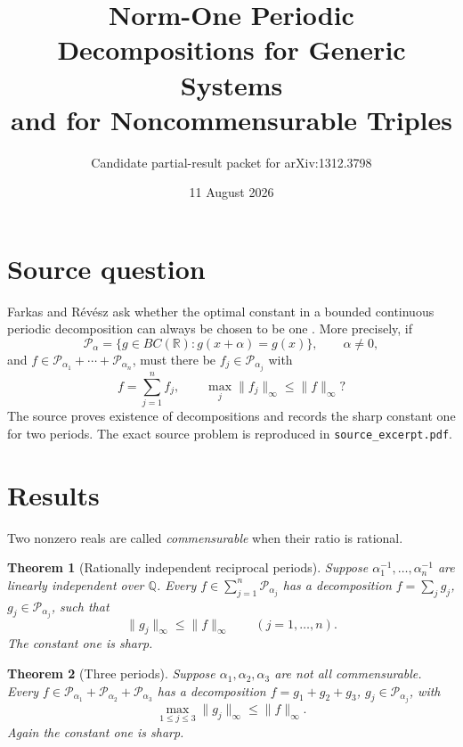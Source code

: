\documentclass[11pt]{article}
\title{Norm-One Periodic Decompositions for Generic Systems\\
and for Noncommensurable Triples}
\author{Candidate partial-result packet for arXiv:1312.3798}
\date{11 August 2026}
\newtheorem{theorem}{Theorem}
\newcommand{\R}{\mathbb R}
\newcommand{\Q}{\mathbb Q}
\newcommand{\Pcal}{\mathcal P}
\begin{document}
\maketitle

\begin{center}
\end{center}

\section{Source question}

Farkas and R\'ev\'esz ask whether the optimal constant in a bounded continuous
periodic decomposition can always be chosen to be one
\cite[problem following Remark 3.5]{FR}.  More precisely, if
\[
 \Pcal_\alpha=\{g\in BC(\R):g(x+\alpha)=g(x)\},\qquad \alpha\ne0,
\]
and $f\in\Pcal_{\alpha_1}+\cdots+\Pcal_{\alpha_n}$, must there be
$f_j\in\Pcal_{\alpha_j}$ with
\[
 f=\sum_{j=1}^n f_j,
 \qquad \max_j\|f_j\|_\infty\le\|f\|_\infty?
\]
The source proves existence of decompositions and records the sharp constant
one for two periods.  The exact source problem is reproduced in
\texttt{source\_excerpt.pdf}.

\section{Results}

Two nonzero reals are called \emph{commensurable} when their ratio is
rational.

\begin{theorem}[Rationally independent reciprocal periods]\label{th:generic}
Suppose $\alpha_1^{-1},\ldots,\alpha_n^{-1}$ are linearly independent over
$\Q$.  Every $f\in\sum_{j=1}^n\Pcal_{\alpha_j}$ has a decomposition
$f=\sum_j g_j$, $g_j\in\Pcal_{\alpha_j}$, such that
\[
 \|g_j\|_\infty\le\|f\|_\infty\qquad(j=1,\ldots,n).
\]
The constant one is sharp.
\end{theorem}

\begin{theorem}[Three periods]\label{th:three}
Suppose $\alpha_1,\alpha_2,\alpha_3$ are not all commensurable.  Every
$f\in\Pcal_{\alpha_1}+\Pcal_{\alpha_2}+\Pcal_{\alpha_3}$ has a
decomposition $f=g_1+g_2+g_3$, $g_j\in\Pcal_{\alpha_j}$, with
\[
 \max_{1\le j\le3}\|g_j\|_\infty\le\|f\|_\infty.
\]
Again the constant one is sharp.
\end{theorem}
\end{document}
